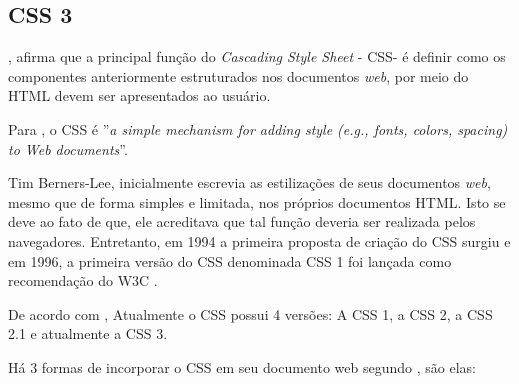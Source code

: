 \subsection{CSS 3}

, afirma que a principal função do \textit{Cascading Style Sheet} - CSS\footnotemark[25] - é definir como os componentes anteriormente estruturados nos documentos \textit{web}, por meio do HTML devem ser apresentados ao usuário.


Para , o CSS é ''\textit{a simple mechanism for adding style (e.g., fonts, colors, spacing) to Web documents}\footnotemark[26]''.


Tim Berners-Lee, inicialmente escrevia as estilizações de seus documentos \textit{web}, mesmo que de forma simples e limitada, nos próprios documentos HTML. Isto se deve ao fato de que, ele acreditava que tal função deveria ser realizada pelos navegadores. Entretanto, em 1994 a primeira proposta de criação do CSS surgiu e em 1996, a primeira versão do CSS denominada CSS 1 foi lançada como recomendação do W3C \cite{silva_css_3}.

De acordo com , Atualmente o CSS possui 4 versões: A CSS 1, a CSS 2, a CSS 2.1 e atualmente a CSS 3.


Há 3 formas de incorporar o CSS em seu documento web segundo \cite{silva_css_3}, são elas: 

